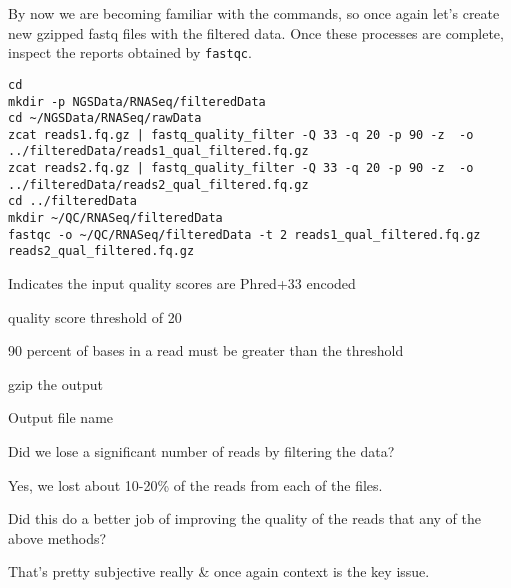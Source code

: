 \begin{steps}
By now we are becoming familiar with the commands, so once again let's create new gzipped fastq files with the filtered data.
Once these processes are complete, inspect the reports obtained by \texttt{fastqc}.\\
\begin{minipage}{\textwidth}
\begin{lstlisting}
cd 
mkdir -p NGSData/RNASeq/filteredData
cd ~/NGSData/RNASeq/rawData 
zcat reads1.fq.gz | fastq_quality_filter -Q 33 -q 20 -p 90 -z  -o  ../filteredData/reads1_qual_filtered.fq.gz
zcat reads2.fq.gz | fastq_quality_filter -Q 33 -q 20 -p 90 -z  -o  ../filteredData/reads2_qual_filtered.fq.gz
cd ../filteredData
mkdir ~/QC/RNASeq/filteredData
fastqc -o ~/QC/RNASeq/filteredData -t 2 reads1_qual_filtered.fq.gz reads2_qual_filtered.fq.gz
\end{lstlisting}
\end{minipage}
\end{steps}

\begin{note}
\begin{description}[style=multiline,labelindent=0cm,align=right,leftmargin=0.8\descriptionlabelspace,rightmargin=1.5cm,font=\ttfamily]
\item[-Q 33] Indicates the input quality scores are Phred+33 encoded
\item[-q 20] quality score threshold of 20
\item[-p 90] 90 percent of bases in a read must be greater than the threshold
\item[-z] gzip the output
\item[-o] Output file name
\end{description}
\end{note}

\begin{questions}
Did we lose a significant number of reads by filtering the data? \\
\begin{answer}
Yes, we lost about 10-20\% of the reads from each of the files. \\
\end{answer}

Did this do a better job of improving the quality of the reads that any of the above methods? \\
\begin{answer}
That's pretty subjective really \& once again context is the key issue. \\
\end{answer}
\end{questions}


